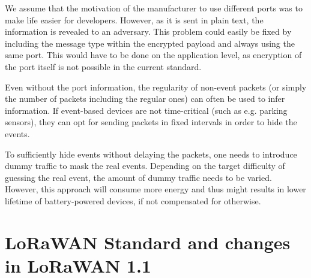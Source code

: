 {We assume that the motivation of the manufacturer to use different
ports was to make life easier for developers. However, as it is sent in
plain text, the information is revealed to an adversary. This
problem could easily be fixed by including the message type within the
encrypted payload and always using the same port. This would have to be
done on the application level, as encryption of the port itself is not
possible in the current standard.}

Even without the port information, the regularity of non-event packets (or simply the number of packets including the regular ones) can often be used to infer information. If event-based devices are not time-critical (such as e.g. parking
sensors), they can opt for sending packets in fixed intervals in order to
hide the events.

To sufficiently hide events without delaying the packets, one needs to introduce dummy traffic to mask the real events.
Depending on the target difficulty of guessing the real event, the amount of dummy
traffic needs to be varied. However, this approach will consume more energy and thus might
results in lower lifetime of battery-powered devices, if not compensated for otherwise.


\chapter{LoRaWAN Standard and changes in LoRaWAN 1.1}\label{h.6snn4dp8j73u}


